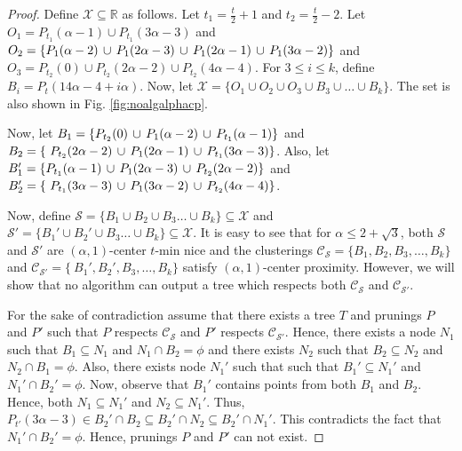 \documentclass[anon,12pt]{colt2016} %
\newcommand{\mc}{\mathcal}
\begin{document}
\begin{proof}
Define $\mc X \subseteq \mathbb{R}$ as follows. Let $t_1 = \frac{t}{2}+1$ and $t_2 = \frac{t}{2}-2$. Let $O_1 = P_{t_1}(\alpha-1)\cup P_{t_1}(3\alpha-3)$ and $O_2 = \{P_{1}(\alpha-2) \thinspace\cup\thinspace P_{1}(2\alpha-3) \thinspace\cup\thinspace P_{1}(2\alpha-1) \thinspace\cup\thinspace P_{1}(3\alpha-2)\}$ and $O_3 = P_{t_2}(0)\cup P_{t_2}(2\alpha-2)\cup P_{t_2}(4\alpha-4)$. For $3\le i\le k$, define $B_i = P_t(14\alpha-4+i\alpha)$. Now, let $\mc X = \{O_1 \cup O_2 \cup O_3\cup B_3 \cup \ldots \cup B_k\}$. The set is also shown in Fig. \ref{fig:noalgalphacp}.

Now, let $B_1 = \{P_{t_2}(0) \thinspace\cup\thinspace  P_{1}(\alpha-2) \thinspace\cup\thinspace P_{t_1}(\alpha-1) \}$ and $B_2 = \{\ P_{t_2}(2\alpha-2) \thinspace\cup\thinspace P_{1}(2\alpha-1)\thinspace\cup\thinspace P_{t_1}(3\alpha-3)\}$. Also, let $B_1' = \{P_{t_1}(\alpha-1) \thinspace\cup\thinspace  P_{1}(2\alpha-3) \thinspace\cup\thinspace P_{t_2}(2\alpha-2) \}$ and $B_2' = \{\ P_{t_1}(3\alpha-3) \thinspace\cup\thinspace P_{1}(3\alpha-2)\thinspace\cup\thinspace P_{t_2}(4\alpha-4)\}$. 

Now, define $\mc S = \{B_1 \cup B_2 \cup B_3\ldots \cup B_k\} \subseteq \mc X$ and $\mc S' = \{B_1' \cup B_2' \cup B_3\ldots \cup B_k\} \subseteq \mc X$. It is easy to see that for $\alpha \le 2+\sqrt{3}$, both $\mc S$ and $\mc S'$ are $(\alpha, 1)$-center $t$-min nice and the clusterings $\mc C_{\mc S} = \{B_1, B_2, B_3, \ldots, B_k\}$ and $\mc C_{\mc S'} = \{\ B_1', B_2', B_3, \ldots, B_k\}$ satisfy $(\alpha, 1)$-center proximity. However, we will show that no algorithm can output a tree which respects both $\mc C_{\mc S}$ and $\mc C_{\mc S'}$.

For the sake of contradiction assume that there exists a tree $T$ and prunings $P$ and $P'$ such that $P$ respects $\mc C_{\mc S}$ and $P'$ respects $\mc C_{\mc S'}$. Hence, there exists a node $N_1$ such that $B_1 \subseteq N_1$ and $N_1 \cap B_2 = \phi$ and there exists $N_2$ such that $B_2 \subseteq N_2$ and $N_2 \cap B_1 = \phi$. Also, there exists node $N_1'$ such that such that $B_1' \subseteq N_1'$ and $N_1' \cap B_2' = \phi$. Now, observe that $B_1'$ contains points from both $B_1$ and $B_2$. Hence, both $N_1 \subseteq N_1'$ and $N_2 \subseteq N_1'$. Thus, $P_{t'}(3\alpha-3)\in B_2'\cap B_2 \subseteq B_2' \cap N_2 \subseteq B_2' \cap N_1'$. This contradicts the fact that $N_1' \cap B_2' = \phi$. Hence, prunings $P$ and $P'$ can not exist.
\end{proof}
\end{document}
